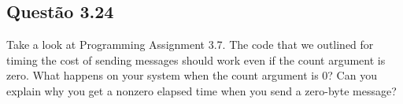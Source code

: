 

\subsection{Questão 3.24}
Take a look at Programming Assignment 3.7. The code that we outlined for
timing the cost of sending messages should work even if the count argument
is zero. What happens on your system when the count argument is 0? Can
you explain why you get a nonzero elapsed time when you send a zero-byte
message?
